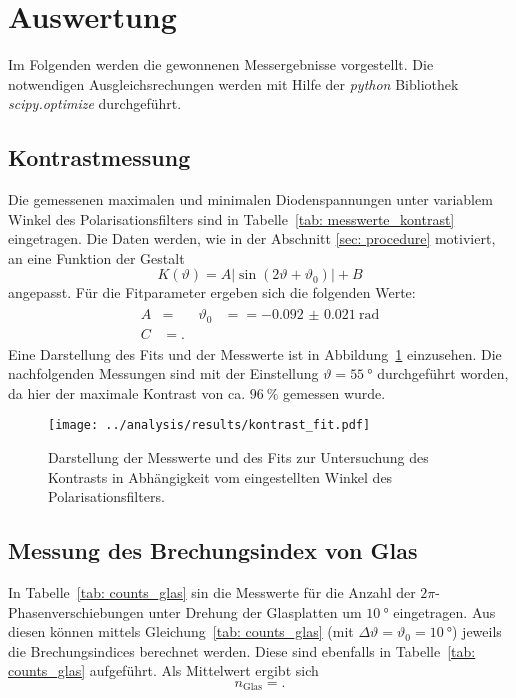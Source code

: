 \newpage
\section{Auswertung}
Im Folgenden werden die gewonnenen Messergebnisse vorgestellt. Die notwendigen Ausgleichsrechungen werden 
mit Hilfe der \emph{python} Bibliothek \emph{scipy.optimize} durchgeführt.

\subsection{Kontrastmessung}
Die gemessenen maximalen und minimalen Diodenspannungen unter variablem Winkel des Polarisationsfilters sind in 
Tabelle~\ref{tab: messwerte_kontrast} eingetragen.
Die Daten werden, wie in der Abschnitt \ref{sec: procedure} motiviert, an eine Funktion der Gestalt
\begin{equation}
    K(\vartheta) = A \left|\sin \left(2 \vartheta + \vartheta_0 \right)\right| + B 
    \label{eq: model_contrast}
\end{equation}
angepasst. Für die Fitparameter ergeben sich die folgenden Werte:
\begin{align}
    \begin{aligned}
    A &=  \quad  & \vartheta_0 &=  = \SI{-0.092(21)}{\radian} \\ 
    C &= .
    \end{aligned}
\end{align}
Eine Darstellung des Fits und der Messwerte ist in Abbildung~\ref{fig: kontrast_fit} einzusehen.
Die nachfolgenden Messungen sind mit der Einstellung $\vartheta = \SI{55}{\degree}$ durchgeführt worden, da hier der maximale 
Kontrast von ca. $\SI{96}{\percent}$ gemessen wurde.  



\begin{figure}
    \centering
    \texttt{[image: ../analysis/results/kontrast\_fit.pdf]}
    \caption{Darstellung der Messwerte und des Fits zur Untersuchung des Kontrasts in Abhängigkeit vom eingestellten Winkel des Polarisationsfilters.}
    \label{fig: kontrast_fit}
\end{figure}


\subsection{Messung des Brechungsindex von Glas}
In Tabelle~\ref{tab: counts_glas} sin die Messwerte für die Anzahl der $2\pi$-Phasenverschiebungen unter Drehung der Glasplatten um $\SI{10}{\degree}$
eingetragen. Aus diesen können mittels Gleichung~\eqref{tab: counts_glas} 
(mit $\Delta\vartheta = \vartheta_0 = \SI{10}{\degree}$) jeweils die Brechungsindices berechnet werden. Diese sind ebenfalls in Tabelle~\ref{tab: counts_glas}  
aufgeführt. Als Mittelwert ergibt sich 
\begin{equation}
    n_{\text{Glas}} = .
\end{equation}

